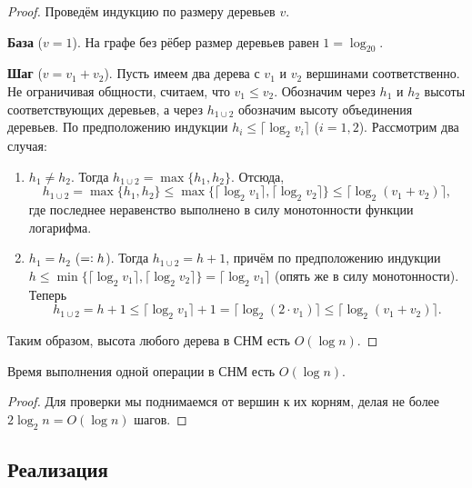 \begin{proof}
    Проведём индукцию по размеру деревьев $v$.
    
    \textbf{База} ($v = 1$). На графе без рёбер размер деревьев равен $1 = \log_20$.

    \textbf{Шаг} ($v = v_1 + v_2$). Пусть имеем два дерева с $v_1$ и $v_2$ вершинами соответственно. Не ограничивая общности, считаем, что $v_1 \leqslant v_2$. Обозначим через $h_1$ и $h_2$ высоты соответствующих деревьев, а через $h_{1 \cup 2}$ обозначим высоту объединения деревьев. По предположению индукции $h_i \leqslant \lceil\log_2v_i\rceil$ ($i = 1, 2$). Рассмотрим два случая:
    \begin{enumerate}[nolistsep]
        \item $h_1 \ne h_2$. Тогда $h_{1 \cup 2} = \max\{h_1, h_2\}$. Отсюда,
        \[
            h_{1 \cup 2} = \max\{h_1, h_2\} \leqslant \max\{\lceil\log_2v_1\rceil, \lceil\log_2v_2\rceil\} \leqslant \lceil\log_2(v_1 + v_2)\rceil,
        \]
        где последнее неравенство выполнено в силу монотонности функции логарифма.
        \item $h_1 = h_2$ ($= \vcentcolon h$). Тогда $h_{1 \cup 2} = h + 1$, причём по предположению индукции $h \leqslant \min\{\lceil\log_2v_1\rceil, \lceil\log_2v_2\rceil\} = \lceil\log_2v_1\rceil$ (опять же в силу монотонности). Теперь
        \[
            h_{1 \cup 2} = h + 1 \leqslant \lceil\log_2v_1\rceil + 1 = \lceil\log_2(2 \cdot v_1)\rceil \leqslant \lceil\log_2(v_1 + v_2)\rceil.
        \]
    \end{enumerate}
    Таким образом, высота любого дерева в СНМ есть $O(\log n)$.
\end{proof}

\begin{corollary}
    Время выполнения одной операции в СНМ есть $O(\log n)$.
\end{corollary}

\begin{proof}
    Для проверки мы поднимаемся от вершин к их корням, делая не более $2\log_2n = O(\log n)$ шагов.
\end{proof}

\subsection{Реализация}


